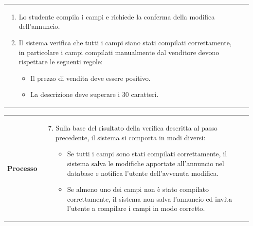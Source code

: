 \documentclass[10pt,a4paper]{article}
\begin{document}
\begin{tabular}{lp{}}
\begin{enumerate}
\begin{itemize}
				\item Almeno una foto.
			\end{itemize}
			\item Lo studente compila i campi e richiede la conferma della modifica dell'annuncio.
			\item Il sistema verifica che tutti i campi siano stati compilati correttamente, in particolare i campi compilati manualmente dal venditore devono rispettare le seguenti regole:
			\begin{itemize}
				\item Il prezzo di vendita deve essere positivo.
				\item La descrizione deve superare i 30 caratteri.
			\end{itemize}
		\end{enumerate}
	\end{tabular}
	
	\begin{tabular}{lp{}}
		\textbf{Processo}&\begin{enumerate}
			\setcounter{enumi}{6}
			\item Sulla base del risultato della verifica descritta al passo precedente, il sistema si comporta in modi diversi:
			\begin{itemize}
				\item Se tutti i campi sono stati compilati correttamente, il sistema salva le modifiche apportate all'annuncio nel database e notifica l'utente dell'avvenuta modifica.
				\item Se almeno uno dei campi non è stato compilato correttamente, il sistema non salva l'annuncio ed invita l'utente a compilare i campi in modo corretto.
			\end{itemize}
		\end{enumerate}
	\end{tabular}
	
\end{document}
